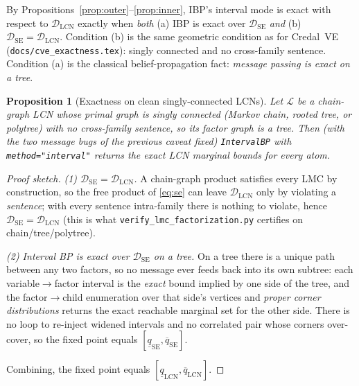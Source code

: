 \documentclass[11pt]{article}
\newtheorem{proposition}{Proposition}
\newcommand{\lo}{\underline}
\newcommand{\hi}{\overline}
\newcommand{\DSE}{\mathcal{D}_{\mathrm{SE}}}
\newcommand{\DLCN}{\mathcal{D}_{\mathrm{LCN}}}
\newcommand{\IBP}{\texttt{IntervalBP}}
\begin{document}
By Propositions~\ref{prop:outer}--\ref{prop:inner}, IBP's interval mode is exact with respect to
$\DLCN$ exactly when \emph{both} (a) IBP is exact over $\DSE$ \emph{and} (b) $\DSE=\DLCN$. Condition
(b) is the same geometric condition as for Credal~VE (\texttt{docs/cve\_exactness.tex}): singly
connected and no cross-family sentence. Condition (a) is the classical belief-propagation fact:
\emph{message passing is exact on a tree}.

\begin{proposition}[Exactness on clean singly-connected LCNs]\label{prop:exacttree}
Let $\mathcal L$ be a chain-graph LCN whose primal graph is singly connected (Markov chain, rooted
tree, or polytree) with no cross-family sentence, so its factor graph is a tree. Then (with the two
message bugs of the previous caveat fixed) \IBP{} with \texttt{method="interval"} returns the exact
LCN marginal bounds for every atom.
\end{proposition}

\begin{proof}[Proof sketch]
\emph{(1) $\DSE=\DLCN$.} A chain-graph product satisfies every LMC by construction, so the free
product of \eqref{eq:se} can leave $\DLCN$ only by violating a \emph{sentence}; with every sentence
intra-family there is nothing to violate, hence $\DSE=\DLCN$ (this is what
\texttt{verify\_lmc\_factorization.py} certifies on chain/tree/polytree).

\emph{(2) Interval BP is exact over $\DSE$ on a tree.} On a tree there is a unique path between any
two factors, so no message ever feeds back into its own subtree: each variable$\to$factor interval is
the \emph{exact} bound implied by one side of the tree, and the factor$\to$child enumeration over
that side's vertices and \emph{proper corner distributions} returns the exact reachable marginal set
for the other side. There is no loop to re-inject widened intervals and no correlated pair whose
corners over-cover, so the fixed point equals $[\lo q_{\mathrm{SE}},\hi q_{\mathrm{SE}}]$.

Combining, the fixed point equals $[\lo q_{\mathrm{LCN}},\hi q_{\mathrm{LCN}}]$.
\end{proof}

\begin{center}
\end{center}
\end{document}
